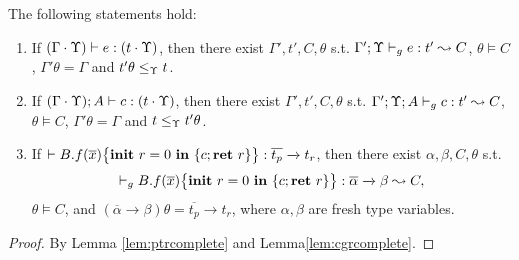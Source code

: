 {{{\begin{lemma}\label{lem:cgrcomplete0}
The following statements hold:
\begin{enumerate}[label={(\alph*)}]
\item\label{lem:cgrcomplete0-1} If $(\Gamma\cdot\Upsilon) \vdash e : (t\cdot\Upsilon)$, then there exist $\Gamma',t',C,\theta$ s.t. $\Gamma';\Upsilon \vdash_{g} e : t' \leadsto C$,  $\theta \vDash C$, $\Gamma'\theta =\Gamma$ and $t'\theta \leq_{\Upsilon} t$.

\item\label{lem:cgrcomplete0-2} If $(\Gamma\cdot\Upsilon); A \vdash c : (t\cdot\Upsilon)$, then there exist $\Gamma',t',C,\theta$ s.t. $\Gamma';\Upsilon; A \vdash_{g} c : t' \leadsto C$,  $\theta \vDash C$, $\Gamma'\theta =\Gamma$ and $t \leq_{\Upsilon} t'\theta $.

\item\label{lem:cgrcomplete0-3} If $\vdash {B.f}(\overline{x})\big\{{{\textbf{init}~ {r}=0 ~\textbf{in}~\{{c};\textbf{ret}~{r}\}}}\big\} : \overline{t_p}\xrightarrow{} t_r$, then there exist $\alpha,\beta,C,\theta$ s.t.
$$
\vdash_{g} {B.f}(\overline{x})\big\{{{\textbf{init}~ {r}=0 ~\textbf{in}~\{{c};\textbf{ret}~{r}\}}}\big\}: \overline{\alpha}\xrightarrow{} \beta \leadsto C,
$$
$\theta \vDash C$, and $(\overline{\alpha}\xrightarrow{} \beta)\theta = \overline{t_p}\xrightarrow{} t_r$, where $\alpha,\beta$ are fresh type variables.
\end{enumerate}
\end{lemma}
\begin{proof}
By Lemma \ref{lem:ptrcomplete} and Lemma\ref{lem:cgrcomplete}.
\end{proof}


}}}
